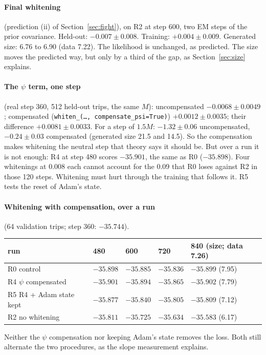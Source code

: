 \documentclass[11pt]{article}
\theoremstyle{remark}\newtheorem{remark}{Remark}
\begin{document}
\paragraph{Final whitening} (prediction (ii) of Section~\ref{sec:fight}), on R2 at step 600, two EM
steps of the prior covariance. Held-out: $-0.007\pm0.008$. Training: $+0.004\pm0.009$. Generated
size: 6.76 to 6.90 (data 7.22). The likelihood is unchanged, as predicted. The size moves the
predicted way, but only by a third of the gap, as Section~\ref{sec:size} explains.

\paragraph{The $\psi$ term, one step} (real step 360, 512 held-out trips, the same $M$):
uncompensated $-0.0068\pm0.0049$; compensated (\texttt{whiten\_(\dots, compensate\_psi=True)})
$+0.0012\pm0.0035$; their difference $+0.0081\pm0.0033$. For a step of $1.5M$: $-1.32\pm0.06$
uncompensated, $-0.24\pm0.03$ compensated (generated size 21.5 and 14.5). So the compensation makes
whitening the neutral step that theory says it should be. But over a run it is not enough: R4 at
step 480 scores $-35.901$, the same as R0 ($-35.898$). Four whitenings at 0.008 each cannot
account for the 0.09 that R0 loses against R2 in those 120 steps. Whitening must hurt through
the training that follows it. R5 tests the reset of Adam's state.

\paragraph{Whitening with compensation, over a run} (64 validation trips; step 360: $-35.744$).
\begin{center}\small
\begin{tabular}{lllll}
\toprule
run & 480 & 600 & 720 & 840 (size; data 7.26)\\
\midrule
R0 control & $-35.898$ & $-35.885$ & $-35.836$ & $-35.899$ (7.95)\\
R4 $\psi$ compensated & $-35.901$ & $-35.894$ & $-35.865$ & $-35.902$ (7.79)\\
R5 R4 + Adam state kept & $-35.877$ & $-35.840$ & $-35.805$ & $-35.809$ (7.12)\\
R2 no whitening & $\mathbf{-35.811}$ & $\mathbf{-35.725}$ & $\mathbf{-35.634}$ & $\mathbf{-35.583}$ (6.17)\\
\bottomrule
\end{tabular}
\end{center}
Neither the $\psi$ compensation nor keeping Adam's state removes the loss. Both still alternate the
two procedures, as the slope measurement explains.
\end{document}
